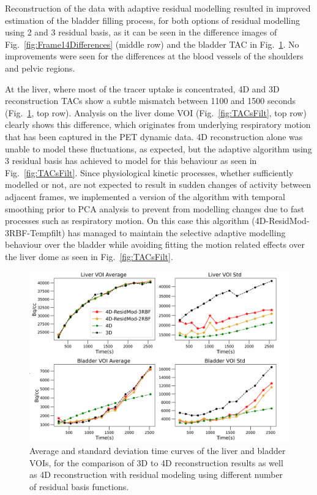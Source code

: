 Reconstruction of the data with adaptive residual modelling resulted in improved estimation of the bladder filling process, for both options of residual modelling using 2 and 3 residual basis, as it can be seen in the difference images of Fig.~\ref{fig:Frame14Differences} (middle row) and the bladder TAC in Fig.~\ref{fig:TACs}. 
No improvements were seen for the differences at the blood vessels of the shoulders and pelvic regions. 

At the liver, where most of the tracer uptake is concentrated, 4D and 3D reconstruction TACs show a subtle mismatch between 1100 and 1500 seconds (Fig.~\ref{fig:TACs}, top row). Analysis on the liver dome VOI (Fig.~\ref{fig:TACsFilt}, top row) clearly shows this difference, which originates from underlying respiratory motion that has been captured in the PET dynamic data. 4D reconstruction alone was unable to model these fluctuations, as expected, but the adaptive algorithm using 3 residual basis has achieved to model for this behaviour as seen in Fig.~\ref{fig:TACsFilt}.
Since physiological kinetic processes, whether sufficiently modelled or not, are not expected to result in sudden changes of activity between adjacent frames, we implemented a version of the algorithm with temporal smoothing prior to PCA analysis to prevent from modelling changes due to fast processes such as respiratory motion. On this case this algorithm (4D-ResidMod-3RBF-Tempfilt) has managed to maintain the selective adaptive modelling behaviour over the bladder while avoiding fitting the motion related effects over the liver dome as seen in Fig.~\ref{fig:TACsFilt}. 

\begin{figure} [!htbp]
\centering
\includegraphics[scale=0.64,angle=0]{3_Results/3_4_Residual/figures/TACs.png}
\caption{Average and standard deviation time curves of the liver and bladder VOIs, for the comparison of 3D to 4D reconstruction results as well as 4D reconstruction with residual modeling using different number of residual basis functions.} 
\label{fig:TACs}
\end{figure}

